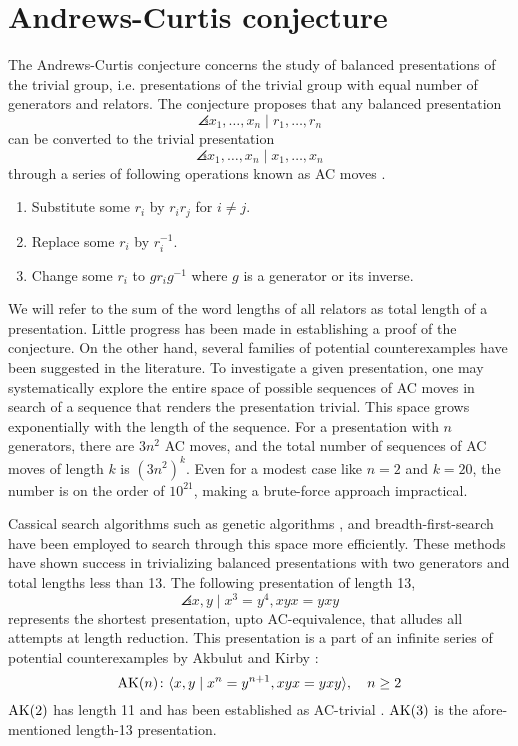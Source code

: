 
\section{Andrews-Curtis conjecture\label{sec:AC}}

The Andrews-Curtis conjecture concerns the study of balanced presentations of the trivial group, i.e. presentations of the trivial group with equal number of generators and relators. The conjecture proposes that any balanced presentation 
\[
\angles{x_1, \dots, x_n \mid r_1, \dots, r_n}
\]
can be converted to the trivial presentation
\[
\angles{x_1, \dots, x_n \mid x_1, \dots, x_n}
\]
through a series of following operations known as AC moves \cite{Andrews-Curtis}.
\begin{enumerate}[label=(AC\arabic*)]
	\item Substitute some $r_i$ by $r_i r_j$ for $i \neq j$.
	\item Replace some $r_i$ by $r_i^{-1}$.
	\item Change some $r_i$ to $g r_i g^{-1}$ where $g$ is a generator or its inverse.
\end{enumerate}

We will refer to the sum of the word lengths of all relators as total length of a presentation. Little progress has been made in establishing a proof of the conjecture. On the other hand, several families of potential counterexamples have been suggested in the literature. To investigate a given presentation, one may systematically explore the entire space of possible sequences of AC moves in search of a sequence that renders the presentation trivial. This space grows exponentially with the length of the sequence. For a presentation with $n$ generators, there are $3n^2$ AC moves, and the total number of sequences of AC moves of length $k$ is $(3n^2)^k$. Even for a modest case like $n=2$ and $k=20$, the number is on the order of $10^{21}$, making a brute-force approach impractical.
\newline 

Cassical search algorithms such as genetic algorithms \cite{genetic}, and breadth-first-search  \cite{bfs-ac} have been employed to search through this space more efficiently. These methods have shown success in trivializing balanced presentations with two generators and total lengths less than 13. The following presentation of length 13,
\[
\angles{x, y \mid x^3 = y^4, xyx = yxy}
\]
represents the shortest presentation, upto AC-equivalence, that alludes all attempts at length reduction. This presentation is a part of an infinite series of potential counterexamples by Akbulut and Kirby \cite{Akbulut-Kirby}:
\[
\text{AK}(n) \colon \langle x, y \mid x^n = y^{n+1}, xyx = yxy\rangle, \quad n \geq 2
\]
$\text{AK}(2)$ has length 11 and has been established as AC-trivial  \cite{genetic}. $\text{AK}(3)$ is the afore-mentioned length-13 presentation. 
\newline

